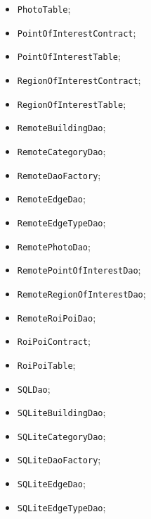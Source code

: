 \documentclass[../DefinizioneDiProdotto.tex]{subfiles}
\begin{document}
\begin{itemize}
\begin{itemize}
		\item \texttt{PhotoTable};
		
		\item \texttt{PointOfInterestContract};
		
		\item \texttt{PointOfInterestTable};
		
		\item \texttt{RegionOfInterestContract};
		
		\item \texttt{RegionOfInterestTable};
		
		\item \texttt{RemoteBuildingDao};
		
		\item \texttt{RemoteCategoryDao};
		
		\item \texttt{RemoteDaoFactory};
		
		\item \texttt{RemoteEdgeDao};
		
		\item \texttt{RemoteEdgeTypeDao};
		
		\item \texttt{RemotePhotoDao};
		
		\item \texttt{RemotePointOfInterestDao};
		
		\item \texttt{RemoteRegionOfInterestDao};
		
		\item \texttt{RemoteRoiPoiDao};
		
		\item \texttt{RoiPoiContract};
		
		\item \texttt{RoiPoiTable};
		
		\item \texttt{SQLDao};
		
		\item \texttt{SQLiteBuildingDao};
		
		\item \texttt{SQLiteCategoryDao};
		
		\item \texttt{SQLiteDaoFactory};
		
		\item \texttt{SQLiteEdgeDao};
		
		\item \texttt{SQLiteEdgeTypeDao};
		

\end{itemize}
\end{itemize}
\end{document}
